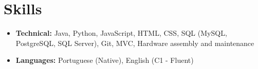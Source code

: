 \documentclass[a4paper,10pt]{article}
\begin{document}

\section{Skills}
    \begin{itemize}
        \item \textbf{Technical:} Java, Python, JavaScript, HTML, CSS, SQL (MySQL, PostgreSQL, SQL Server), Git, MVC, Hardware assembly and maintenance
        \item \textbf{Languages:} Portuguese (Native), English (C1 - Fluent)
    \end{itemize}
\end{document}
